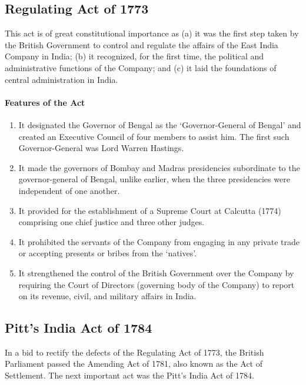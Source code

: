 \begin{multicol}{2}
\subsection{Regulating Act of 1773}
This act is of great constitutional importance as (a) it was the first step taken by the British Government to control and regulate the affairs of the East India Company in India; (b) it recognized, for the first time, the political and administrative functions of the Company; and (c) it laid the foundations of central administration in India.

\paragraph{Features of the Act}

\begin{enumerate}
  \item It designated the Governor of Bengal as the `Governor-General of Bengal' and created an Executive Council of four members to assist him. The first such Governor-General was Lord Warren Hastings.
  \item It made the governors of Bombay and Madras presidencies subordinate to the governor-general of Bengal, unlike earlier, when the three presidencies were independent of one another.
  \item It provided for the establishment of a Supreme Court at Calcutta (1774) comprising one chief justice and three other judges.
  \item It prohibited the servants of the Company from engaging in any private trade or accepting presents or bribes from the `natives'.
  \item It strengthened the control of the British Government over the Company by requiring the Court of Directors (governing body of the Company) to report on its revenue, civil, and military affairs in India.
\end{enumerate}

\subsection{Pitt's India Act of 1784}

In a bid to rectify the defects of the Regulating Act of 1773, the British Parliament passed the Amending Act of 1781, also known as the Act of Settlement. The next important act was the Pitt's India Act of 1784.


\end{multicol}
